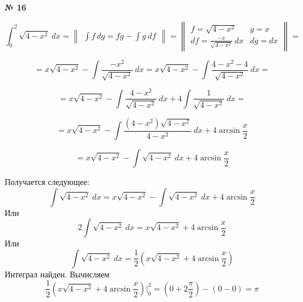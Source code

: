 \documentclass{article}
\begin{document}
\textbf{№ 16} 
\large

$$ \int_{0}^{2} \sqrt{4-x^2} \ dx 
= \begin{Vmatrix} \int f \,dg = fg - \int g \ df \end{Vmatrix} 
= \begin{Vmatrix} f = \sqrt{4-x^2} & g = x \\
                  df = \frac{-x}{\sqrt{4-x^2}} \ dx  & dg = dx \end{Vmatrix} 
= $$

$$ = x\sqrt{4-x^2} - \int \frac{-x^2}{\sqrt{4-x^2}} \ dx 
= x\sqrt{4-x^2} - \int \frac{4-x^2-4}{\sqrt{4-x^2}} \ dx 
=  $$

$$ = x\sqrt{4-x^2} - \int \frac{4-x^2}{\sqrt{4-x^2}} \ dx + 4 \int \frac{1}{\sqrt{4-x^2}} \ dx
= $$

$$ = x\sqrt{4-x^2} - \int \frac{(4-x^2)\sqrt{4-x^2}}{4-x^2} \ dx + 4 \arcsin{\frac{x}{2}}
$$

$$ = x\sqrt{4-x^2} - \int \sqrt{4-x^2} \ dx + 4 \arcsin{\frac{x}{2}}
$$

Получается следующее: 
$$ \int \sqrt{4-x^2} \ dx = x\sqrt{4-x^2} - \int \sqrt{4-x^2} \ dx + 4 \arcsin{\frac{x}{2}} $$
Или
$$ 2\int \sqrt{4-x^2} \ dx = x\sqrt{4-x^2} + 4 \arcsin{\frac{x}{2}} $$
Или
$$ \int \sqrt{4-x^2} \ dx = \frac{1}{2} \left( x\sqrt{4-x^2} + 4 \arcsin{\frac{x}{2}} \right) $$
Интеграл найден. Вычисляем
$$ \frac{1}{2} \left( x\sqrt{4-x^2} + 4 \arcsin{\frac{x}{2}} \right) \bigg\vert_{0}^{2} 
= \left( 0 + 2 \frac{\pi}{2} \right) - \left( 0 - 0 \right) 
= \pi$$
\end{document}
